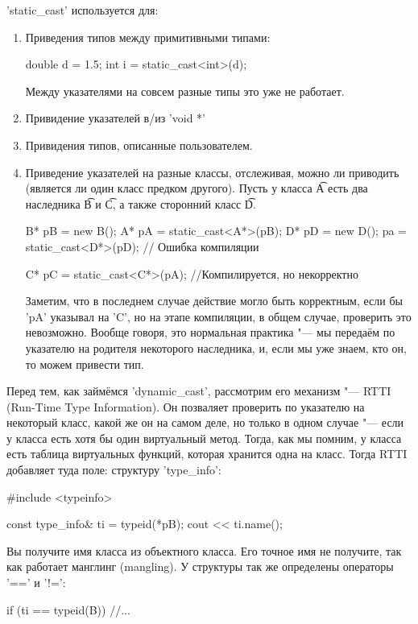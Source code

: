 \cpp'static_cast' используется для:
\begin{enumerate}
\item
	Приведения типов между примитивными типами:
\begin{cppcode}
double d = 1.5;
int i = static_cast<int>(d);
\end{cppcode}
	Между указателями на совсем разные типы это уже не работает.

\item
	Привидение указателей в/из \cpp'void *'

\item
	Привидения типов, описанные пользователем.

\item
	Приведение указателей на разные классы, отслеживая, можно ли приводить (является ли один класс предком другого).
	Пусть у класса \t{A} есть два наследника \t{B} и \t{C}, а также сторонний класс \t{D}.
\begin{cppcode}
B* pB = new B();
A* pA = static_cast<A*>(pB);
D* pD = new D();
pa = static_cast<D*>(pD); // Ошибка компиляции

C* pC = static_cast<C*>(pA); //Компилируется, но некорректно
\end{cppcode}
	Заметим, что в последнем случае действие могло быть корректным, если бы \cpp'pA' указывал на \cpp'C',
	но на этапе компиляции, в общем случае, проверить это невозможно.
	Вообще говоря, это нормальная практика "--- мы передаём по указателю на родителя некоторого наследника,
	и, если мы уже знаем, кто он, то можем привести тип.
\end{enumerate}

Перед тем, как займёмся \cpp'dynamic_cast', рассмотрим его механизм "--- RTTI (Run-Time Type Information).
Он позваляет проверить по указателю на некоторый класс, какой же он на самом деле,
но только в одном случае "--- если у класса есть хотя бы один виртуальный метод.
Тогда, как мы помним, у класса есть таблица виртуальных функций, которая хранится одна на класс.
Тогда RTTI добавляет туда поле: структуру \cpp'type_info':
\begin{cppcode}
#include <typeinfo>

const type_info& ti = typeid(*pB);
cout << ti.name();
\end{cppcode}
Вы получите имя класса из объектного класса.
Его точное имя не получите, так как работает манглинг (mangling).
У структуры так же определены операторы \cpp'==' и \cpp'!=':
\begin{cppcode}
if (ti == typeid(B))
	//...
\end{cppcode}


